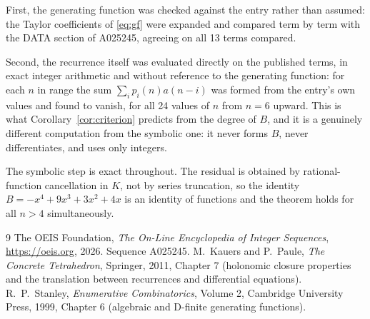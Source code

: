 \documentclass[11pt,a4paper]{article}
\theoremstyle{plain}
\theoremstyle{definition}
\begin{document}
First, the generating function was checked against the entry rather than assumed: the
Taylor coefficients of \eqref{eq:gf} were expanded and compared term by term with the DATA
section of A025245, agreeing on all 13 terms compared.

Second, the recurrence itself was evaluated directly on the published terms, in exact
integer arithmetic and without reference to the generating function: for each $n$ in range
the sum $\sum_{i}p_{i}(n)a(n-i)$ was formed from the entry's own values and found to
vanish, for all 24 values of $n$ from $n=6$ upward. This is what
Corollary~\ref{cor:criterion} predicts from the degree of $B$, and it is a genuinely
different computation from the symbolic one: it never forms $B$, never differentiates, and
uses only integers.

The symbolic step is exact throughout. The residual is obtained by rational-function
cancellation in $K$, not by series truncation, so the identity $B=- x^{4} + 9 x^{3} + 3 x^{2} + 4 x$ is an
identity of functions and the theorem holds for all $n>4$ simultaneously.

\begin{thebibliography}{9}
 The OEIS Foundation, \emph{The On-Line Encyclopedia of Integer Sequences},
\url{https://oeis.org}, 2026. Sequence A025245.
 M.~Kauers and P.~Paule, \emph{The Concrete Tetrahedron}, Springer, 2011,
Chapter 7 (holonomic closure properties and the translation between recurrences and
differential equations).
 R.~P.~Stanley, \emph{Enumerative Combinatorics}, Volume 2, Cambridge
University Press, 1999, Chapter 6 (algebraic and D-finite generating functions).
\end{thebibliography}
\end{document}
